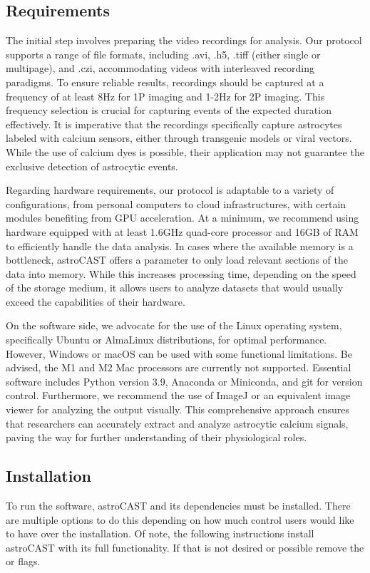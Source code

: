 \subsection{Requirements}
The initial step involves preparing the video recordings for analysis. Our protocol supports a range of file formats, including .avi, .h5, .tiff (either single or multipage), and .czi, accommodating videos with interleaved recording paradigms. To ensure reliable results, recordings should be captured at a frequency of at least 8Hz for \ac{1P} imaging and 1-2Hz for \ac{2P} imaging. This frequency selection is crucial for capturing events of the expected duration effectively. It is imperative that the recordings specifically capture astrocytes labeled with calcium sensors, either through transgenic models or viral vectors. While the use of calcium dyes is possible, their application may not guarantee the exclusive detection of astrocytic events.

Regarding hardware requirements, our protocol is adaptable to a variety of configurations, from personal computers to cloud infrastructures, with certain modules benefiting from \ac{GPU} acceleration. At a minimum, we recommend using hardware equipped with at least 1.6GHz quad-core processor and 16GB of RAM to efficiently handle the data analysis. In cases where the available memory is a bottleneck, astroCAST offers a  parameter to only load relevant sections of the data into memory. While this increases processing time, depending on the speed of the storage medium, it allows users to analyze datasets that would usually exceed the capabilities of their hardware.

On the software side, we advocate for the use of the Linux operating system, specifically Ubuntu or AlmaLinux distributions, for optimal performance. However, Windows or macOS can be used with some functional limitations. Be advised, the M1 and M2 Mac processors are currently not supported. Essential software includes Python version 3.9, Anaconda or Miniconda, and git for version control. Furthermore, we recommend the use of ImageJ or an equivalent image viewer for analyzing the output visually. This comprehensive approach ensures that researchers can accurately extract and analyze astrocytic calcium signals, paving the way for further understanding of their physiological roles.

\subsection{Installation}
To run the software, astroCAST and its dependencies must be installed. There are multiple options to do this depending on how much control users would like to have over the installation. Of note, the following instructions install astroCAST with its full functionality. If that is not desired or possible remove the  or \inlineBash{[all]} flags.

